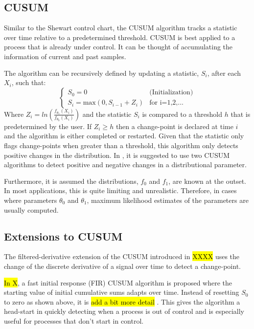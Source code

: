\subsection{CUSUM}
Similar to the Shewart control chart, the CUSUM algorithm tracks a statistic over time relative to a predetermined threshold. CUSUM is best applied to a process that is already under control. It can be thought of accumulating the information of current and past samples. 

The algorithm can be recursively defined by updating a statistic, $S_i$, after each $X_i$, such that:
\begin{equation}
  \begin{cases}
    S_0 = 0  & \text{(Initialization)} \\
    S_i = \text{max}(0, S_{i-1} + Z_i) & \text{for i=1,2,...}
  \end{cases}
\end{equation}
Where $Z_i=ln(\frac{f_{\theta_1}(X_i)}{f_{\theta_0}(X_i)})$ and the statistic $S_i$ is compared to a threshold $h$ that is predetermined by the user. If $Z_i \geq h$ then a change-point is declared at time $i$ and the algorithm is either completed or restarted. Given that the statistic only flags change-points when greater than a threshold, this algorithm only detects positive changes in the distribution. In \cite{page1954continuous}, it is suggested to use two CUSUM algorithms to detect positive and negative changes in a distributional parameter.

Furthermore, it is assumed the distributions, $f_0$ and $f_1$, are known at the outset. In most applications, this is quite limiting and unrealistic. Therefore, in cases where parameters $\theta_0$ and $\theta_1$, maximum likelihood estimates of the parameters are usually computed.

\subsection{Extensions to CUSUM}
The filtered-derivative extension of the CUSUM introduced in \hl{XXXX} uses the change of the discrete derivative of a signal over time to detect a change-point. 

\hl{In X}, a fast initial response (FIR) CUSUM algorithm is proposed where the starting value of initial cumulative sums adapts over time. Instead of resetting $S_0$ to zero as shown above, it is \hl{add a bit more detail} . This gives the algorithm a head-start in quickly detecting when a process is out of control and is especially useful for processes that don't start in control.

